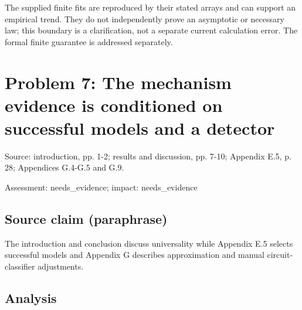 \documentclass[11pt]{article}
\begin{document}
The supplied finite fits are reproduced by their stated arrays and can support an empirical trend. They do not independently prove an asymptotic or necessary law; this boundary is a clarification, not a separate current calculation error. The formal finite guarantee is addressed separately.

\section*{Problem 7: The mechanism evidence is conditioned on successful models and a detector}

Source: introduction, pp. 1-2; results and discussion, pp. 7-10; Appendix E.5, p. 28; Appendices G.4-G.5 and G.9.

Assessment: needs\_evidence; impact: needs\_evidence

\subsection*{Source claim (paraphrase)}

The introduction and conclusion discuss universality while Appendix E.5 selects successful models and Appendix G describes approximation and manual circuit-classifier adjustments.

\subsection*{Analysis}
\end{document}
